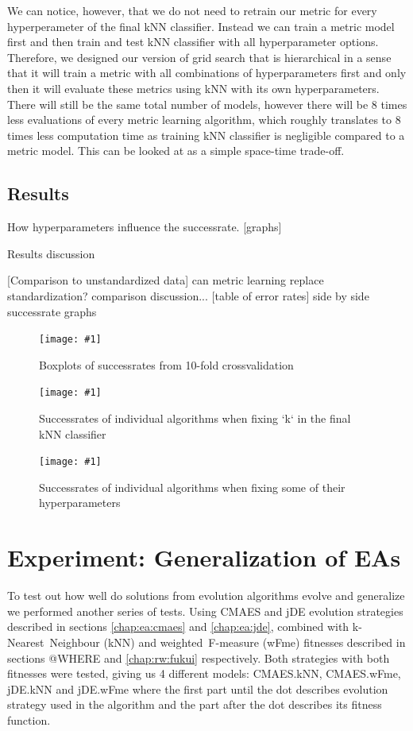 \documentclass[12pt,a4paper]{report}
\newcommand{\cenfig}[3]{
\begin{figure}[ht]
	\centering
    \texttt{[image: \#1]}
    \caption{#2} \label{#3}
\end{figure}
}
\begin{document}
We can notice, however, that we do not need to retrain our metric for every hyperperameter of the final kNN classifier. Instead we can train a metric model first and then train and test kNN classifier with all hyperparameter options. Therefore, we designed our version of grid search that is hierarchical in a sense that it will train a metric with all combinations of hyperparameters first and only then it will evaluate these metrics using kNN with its own hyperparameters. There will still be the same total number of models, however there will be 8 times less evaluations of every metric learning algorithm, which roughly translates to 8 times less computation time as training kNN classifier is negligible compared to a metric model. This can be looked at as a simple space-time trade-off.


\subsection{Results}

How hyperparameters influence the successrate. [graphs] %

Results discussion %



[Comparison to unstandardized data]
can metric learning replace standardization? %
comparison discussion... %
[table of error rates] %
side by side successrate graphs %

\cenfig{graphs/classification/sr.pdf}{Boxplots of successrates from 10-fold crossvalidation}{fig:cl:sr}

\cenfig{graphs/classification/sr_knn}{Successrates of individual algorithms when fixing `k` in the final kNN classifier}{fig:cl:kpar}

\cenfig{graphs/classification/sr_hyp}{Successrates of individual algorithms when fixing some of their hyperparameters}{fig:cl:hyp}

\section{Experiment: Generalization of EAs} \label{chap:exp:fitness}

To test out how well do solutions from evolution algorithms evolve and generalize we performed another series of tests. Using CMAES and jDE evolution strategies described in sections \ref{chap:ea:cmaes} and \ref{chap:ea:jde}, combined with k-Nearest~Neighbour (kNN) and weighted~F-measure (wFme) fitnesses described in sections @WHERE and \ref{chap:rw:fukui} respectively. Both strategies with both fitnesses were tested, giving us 4 different models: CMAES.kNN, CMAES.wFme, jDE.kNN and jDE.wFme where the first part until the dot describes evolution strategy used in the algorithm and the part after the dot describes its fitness function.
\end{document}
